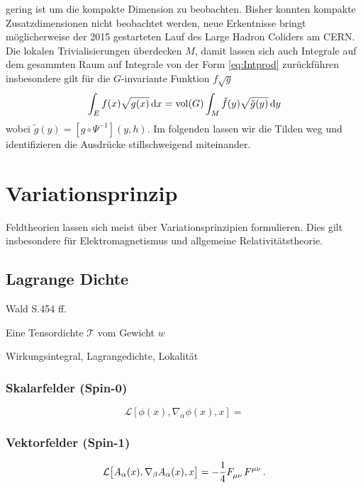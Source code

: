 gering ist um die kompakte Dimension zu beobachten. Bisher konnten kompakte
Zusatzdimensionen nicht beobachtet werden, neue Erkentnisse bringt
möglicherweise der 2015 gestarteten Lauf des Large Hadron Coliders am CERN. Die
lokalen Trivialisierungen überdecken $M$, damit lassen sich auch Integrale auf dem gesammten Raum auf
Integrale von der Form \eqref{eq:Intprod} zurückführen insbesondere gilt für die
$G$-invariante Funktion $f\sqrt{g}$
\begin{equation}
\int_{E}f(x)\sqrt{g(x)}\dif x=\vol
(G)\int_{M}\tilde{f}\left(y\right)\sqrt{\tilde{g}(y)}\dif y
\end{equation}
wobei $\tilde{g}(y)=\left[g\circ\Psi^{-1}\right](y,h)$. Im folgenden lassen wir
die Tilden weg und identifizieren die Ausdrücke stillschweigend miteinander.
\section{Variationsprinzip}
Feldtheorien lassen sich meist über
Variationsprinzipien formulieren. Dies gilt insbesondere für
Elektromagnetismus und allgemeine Relativitätstheorie.
\subsection{Lagrange Dichte}
Wald\cite{wald2010general} S.454 ff.
\begin{definition}[Tensordichte]
Eine Tensordichte $\mathcal{T}$ vom Gewicht $w$
\end{definition}
Wirkungsintegral, Lagrangedichte, Lokalität
\begin{beispiel}
\end{beispiel}
\begin{definition}[Variationsableitung]
\end{definition}
\subsubsection{Skalarfelder (Spin-0)}
\begin{equation}
\mathcal{L}\left[\phi(x),\nabla_\alpha\phi(x),x\right]=
\end{equation}
\subsubsection{Vektorfelder (Spin-1)}
\begin{equation}
\mathcal{L}\left[A_\alpha(x),\nabla_\beta
A_\alpha(x),x\right]=-\frac{1}{4}\tensor{F}{_\mu_\nu}\tensor{F}{^\mu^\nu}\,.
\end{equation}

